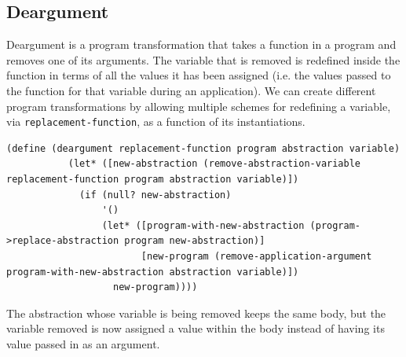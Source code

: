 \documentclass[a4paper,10pt]{article}
\begin{document}
\subsection{Deargument}
Deargument is a program transformation that takes a function in a program and removes one of its arguments.  The variable that is removed is redefined inside the function in terms of all the values it has been assigned (i.e. the values passed to the function for that variable during an application).  We can create different program transformations by allowing multiple schemes for redefining a variable, via \texttt{replacement-function},  as a function of its instantiations.  
\begin{lstlisting}[frame=trBL]
(define (deargument replacement-function program abstraction variable)
           (let* ([new-abstraction (remove-abstraction-variable replacement-function program abstraction variable)])
             (if (null? new-abstraction)
                 '()
                 (let* ([program-with-new-abstraction (program->replace-abstraction program new-abstraction)]
                        [new-program (remove-application-argument program-with-new-abstraction abstraction variable)])
                   new-program))))
\end{lstlisting}
The abstraction whose variable is being removed keeps the same body, but the variable removed is now assigned a value  within the body instead of having its value passed in as an argument.
\end{document}
